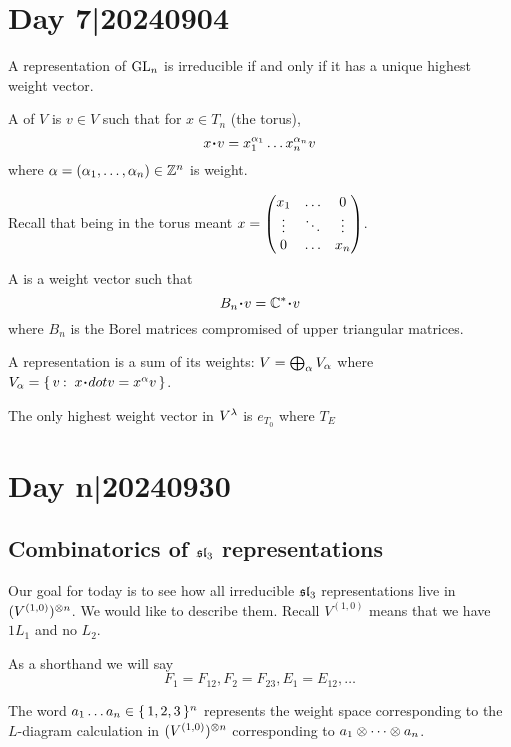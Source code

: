 \documentclass[12pt]{memoir}
\begin{document}
\section{Day 7|20240904}

\begin{Th}
A representation of $\mathrm{GL}_n$ is irreducible if and only if it has a unique highest weight vector.
\end{Th}

\begin{Def}
    A  of $V$ is $v\in V$ such that for $x\in T_n$ (the torus), 
    $$x\.v=x_1^{\al_1}\dots x_n^{\al_n}v$$
    where $\alpha=(\alpha_1,\dots,\alpha_n)\in\mathbb{Z}^n$ is weight.
\end{Def}

Recall that being in the torus meant $x=\begin{pmatrix} x_1 & \dots & 0 \\ \vdots & \ddots & \vdots \\ 0 & \dots & x_n \end{pmatrix}$.

\begin{Def}
    A  is a weight vector such that 
    $$B_n\.v=\bC^\ast\. v$$
    where $B_n$ is the Borel matrices compromised of upper triangular matrices.
\end{Def}

A representation is a sum of its weights: $V=\bigoplus_{\alpha}V_\alpha$ where $V_\al=\set{v\:\ x\.dot v=x^\al v}$.

\begin{Lem}
The only highest weight vector in $V^\lambda$ is $e_{T_0}$ where $T_E$
\end{Lem}

\section{Day n|20240930}

\subsection{Combinatorics of $\mathfrak{sl}_3$ representations}

Our goal for today is to see how all irreducible $\mathfrak{sl}_3$ representations live in $(V^{(1,0)})^{\otimes n}$. We would like to describe them. Recall $V^{(1,0)}$ means that we have $1L_1$ and no $L_2$.\par
As a shorthand we will say 
$$F_1=F_{12}, F_2=F_{23}, E_1=E_{12},\dots$$

\begin{Def}
    The word $a_1\dots a_n\in\{\,1,2,3\,\}^n$ represents the weight space corresponding to the $L$-diagram calculation in $(V^{(1,0)})^{\otimes n}$ corresponding to 
    $a_1\otimes\cdots\otimes a_n$.
\end{Def}
\end{document}
